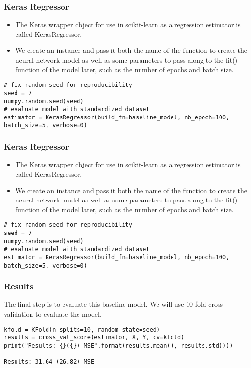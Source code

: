 \begin{frame}[fragile] \frametitle{Keras Regressor}
 \begin{itemize}
 \item The Keras wrapper object for use in scikit-learn as a regression estimator is called KerasRegressor. 
 \item We create an instance and pass it both the name of the function to create the neural network model as well as some parameters to pass along to the fit() function of the model later, such as the number of epochs and batch size.
 \end{itemize}
\begin{lstlisting}
# fix random seed for reproducibility
seed = 7
numpy.random.seed(seed)
# evaluate model with standardized dataset
estimator = KerasRegressor(build_fn=baseline_model, nb_epoch=100, batch_size=5, verbose=0)
\end{lstlisting}
\end{frame}


\begin{frame}[fragile] \frametitle{Keras Regressor}
 \begin{itemize}
 \item The Keras wrapper object for use in scikit-learn as a regression estimator is called KerasRegressor. 
 \item We create an instance and pass it both the name of the function to create the neural network model as well as some parameters to pass along to the fit() function of the model later, such as the number of epochs and batch size.
 \end{itemize}
\begin{lstlisting}
# fix random seed for reproducibility
seed = 7
numpy.random.seed(seed)
# evaluate model with standardized dataset
estimator = KerasRegressor(build_fn=baseline_model, nb_epoch=100, batch_size=5, verbose=0)
\end{lstlisting}
\end{frame}

\begin{frame}[fragile] \frametitle{Results}
The final step is to evaluate this baseline model. We will use 10-fold cross validation to evaluate the model.
\begin{lstlisting}
kfold = KFold(n_splits=10, random_state=seed)
results = cross_val_score(estimator, X, Y, cv=kfold)
print("Results: {}({}) MSE".format(results.mean(), results.std()))

Results: 31.64 (26.82) MSE
\end{lstlisting}
\end{frame}



